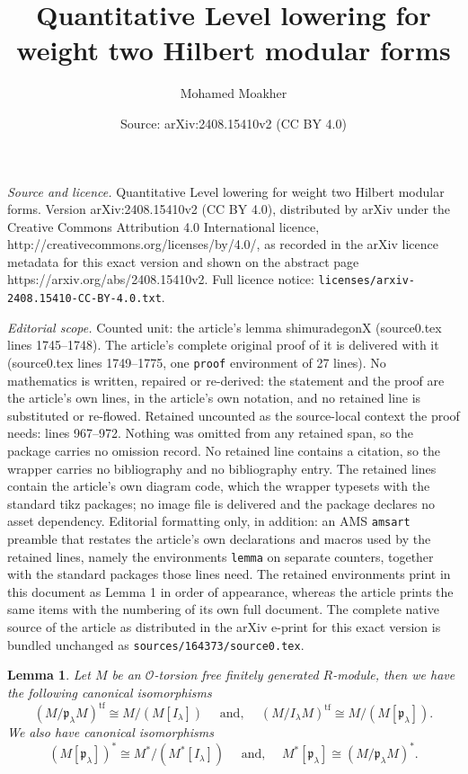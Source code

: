 \documentclass[10pt,a4paper]{amsart}
\title{Quantitative Level lowering for weight two Hilbert modular forms}
\author{Mohamed Moakher}
\date{Source: arXiv:2408.15410v2 (CC BY 4.0)}
\newtheorem{lemma}{Lemma}
\newcommand{\tf}{\operatorname{tf}} %
\begin{document}
\maketitle

\noindent\emph{Source and licence.} Quantitative Level lowering for weight two Hilbert modular forms. Version arXiv:2408.15410v2 (CC BY 4.0), distributed by arXiv under the Creative Commons Attribution 4.0 International licence, http://creativecommons.org/licenses/by/4.0/, as recorded in the arXiv licence metadata for this exact version and shown on the abstract page https://arxiv.org/abs/2408.15410v2. Full licence notice: \texttt{licenses/arxiv-2408.15410-CC-BY-4.0.txt}.\par\smallskip

\noindent\textit{Editorial scope.} Counted unit: the article's lemma shimuradegonX (source0.tex lines 1745--1748). The article's complete original proof of it is delivered with it (source0.tex lines 1749--1775, one \texttt{proof} environment of 27 lines). No mathematics is written, repaired or re-derived: the statement and the proof are the article's own lines, in the article's own notation, and no retained line is substituted or re-flowed.  Retained uncounted as the source-local context the proof needs: lines 967--972.  Nothing was omitted from any retained span, so the package carries no omission record.  No retained line contains a citation, so the wrapper carries no bibliography and no bibliography entry.  The retained lines contain the article's own diagram code, which the wrapper typesets with the standard tikz packages; no image file is delivered and the package declares no asset dependency.  Editorial formatting only, in addition: an AMS \texttt{amsart} preamble that restates the article's own declarations and macros used by the retained lines, namely the environments \texttt{lemma} on separate counters, together with the standard packages those lines need.  The retained environments print in this document as Lemma 1 in order of appearance, whereas the article prints the same items with the numbering of its own full document.  The complete native source of the article as distributed in the arXiv e-print for this exact version is bundled unchanged as \texttt{sources/164373/source0.tex}.
\begin{lemma}\label{quotientsiso}
    Let $M$ be an $\mathcal{O}$-torsion free finitely generated $R$-module, then we have the following canonical isomorphisms
    $$ (M/\mathfrak{p}_\lambda M)^{\tf} \cong M/(M[I_\lambda]) \quad \text{ and, } \quad (M/I_\lambda M)^{\tf}\cong M/(M[\mathfrak{p}_\lambda]).$$
    We also have canonical isomorphisms
    $$ (M[\mathfrak{p}_\lambda])^*\cong M^*/(M^*[I_\lambda]) \quad \text{ and, } \quad M^*[\mathfrak{p}_\lambda]\cong (M/\mathfrak{p_\lambda}M)^*. $$
\end{lemma}
\end{document}
